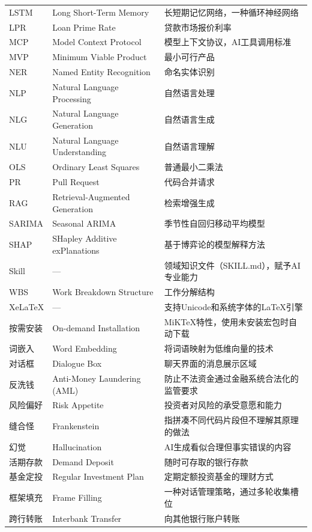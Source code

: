 \begin{longtable}{lp{2.5cm}p{7cm}}
LSTM & Long Short-Term Memory & 长短期记忆网络，一种循环神经网络 \\
LPR & Loan Prime Rate & 贷款市场报价利率 \\
MCP & Model Context Protocol & 模型上下文协议，AI工具调用标准 \\
MVP & Minimum Viable Product & 最小可行产品 \\
NER & Named Entity Recognition & 命名实体识别 \\
NLP & Natural Language Processing & 自然语言处理 \\
NLG & Natural Language Generation & 自然语言生成 \\
NLU & Natural Language Understanding & 自然语言理解 \\
OLS & Ordinary Least Squares & 普通最小二乘法 \\
PR & Pull Request & 代码合并请求 \\
RAG & Retrieval-Augmented Generation & 检索增强生成 \\
SARIMA & Seasonal ARIMA & 季节性自回归移动平均模型 \\
SHAP & SHapley Additive exPlanations & 基于博弈论的模型解释方法 \\
Skill & --- & 领域知识文件（SKILL.md），赋予AI专业能力 \\
WBS & Work Breakdown Structure & 工作分解结构 \\
XeLaTeX & --- & 支持Unicode和系统字体的LaTeX引擎 \\
按需安装 & On-demand Installation & MiKTeX特性，使用未安装宏包时自动下载 \\
词嵌入 & Word Embedding & 将词语映射为低维向量的技术 \\
对话框 & Dialogue Box & 聊天界面的消息展示区域 \\
反洗钱 & Anti-Money Laundering (AML) & 防止不法资金通过金融系统合法化的监管要求 \\
风险偏好 & Risk Appetite & 投资者对风险的承受意愿和能力 \\
缝合怪 & Frankenstein & 指拼凑不同代码片段但不理解其原理的做法 \\
幻觉 & Hallucination & AI生成看似合理但事实错误的内容 \\
活期存款 & Demand Deposit & 随时可存取的银行存款 \\
基金定投 & Regular Investment Plan & 定期定额投资基金的理财方式 \\
框架填充 & Frame Filling & 一种对话管理策略，通过多轮收集槽位 \\
跨行转账 & Interbank Transfer & 向其他银行账户转账 \\

\end{longtable}
